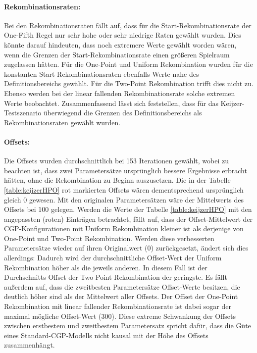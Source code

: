\paragraph{Rekombinationsraten:}
Bei den Rekombinationsraten fällt auf, dass für die Start-Re\-kom\-bi\-na\-tions\-ra\-te der One-Fifth Regel nur sehr hohe oder sehr niedrige Raten gewählt wurden.
Dies könnte darauf hindeuten, dass noch extremere Werte gewählt worden wären, wenn die Grenzen der Start-Rekombinationsrate einen größeren Spielraum zugelassen hätten.
Für die One-Point und Uniform Rekombination wurden für die konstanten Start-Rekombinationsraten ebenfalls Werte nahe des Definitionsbereichs gewählt.
Für die Two-Point Rekombination trifft dies nicht zu.
Ebenso werden bei der linear fallenden Rekombinationsrate solche extremen Werte beobachtet.
Zusammenfassend lässt sich feststellen, dass für das Keijzer-Testszenario überwiegend die Grenzen des Definitionsbereichs als Rekombinationsraten gewählt wurden.
\paragraph{Offsets:}
Die Offsets wurden durchschnittlich bei 153 Iterationen gewählt, wobei zu beachten ist, dass zwei Parametersätze ursprünglich bessere Ergebnisse erbracht hätten, ohne die Rekombination zu Beginn auszusetzen.
Die in der Tabelle \ref{table:keijzerHPO} rot markierten Offsets wären dementsprechend ursprünglich gleich 0 gewesen.
Mit den originalen Parametersätzen wäre der Mittelwerts des Offsets bei 100 gelegen.
Werden die Werte der Tabelle \ref{table:keijzerHPO} mit den angepassten (roten) Einträgen betrachtet, fällt auf, dass der Offset-Mittelwert der CGP-Konfigurationen mit Uniform Rekombination kleiner ist als derjenige von One-Point und Two-Point Rekombination.
Werden diese verbesserten Parametersätze wieder auf ihren Originalwert (0) zurückgesetzt, ändert sich dies allerdings: Dadurch wird der durchschnittliche Offset-Wert der Uniform Rekombination höher als die jeweils anderen.
In diesem Fall ist der Durchschnitts-Offset der Two-Point Rekombination der geringste.
Es fällt außerdem auf, dass die zweitbesten Parametersätze Offset-Werte besitzen, die deutlich höher sind als der Mittelwert aller Offsets.
Der Offset der One-Point Rekombination mit linear fallender Rekombinationsrate ist dabei sogar der maximal mögliche Offset-Wert (300).
Diese extreme Schwankung der Offsets zwischen erstbestem und zweitbestem Parametersatz spricht dafür, dass die Güte eines Standard-CGP-Modells nicht kausal mit der Höhe des Offsets zusammenhängt.


